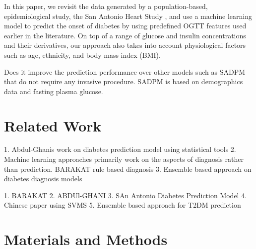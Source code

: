 \documentclass[journal,comsoc]{IEEEtran}
\begin{document}
In this paper, we revisit the data generated by a population-based, epidemiological study, the San Antonio Heart Study \cite{burke_rapid_1999, lorenzo_trend_2006}, and use a machine learning model to predict the onset of diabetes by using predefined OGTT features used earlier in the literature. On top of a range of glucose and insulin concentrations and their derivatives, our approach also takes into account physiological factors such as age, ethnicity, and body mass index (BMI).
%

Does it improve the prediction performance over other models such as SADPM that do not require any invasive procedure. SADPM is based on demographics data and fasting plasma glucose.





\section{Related Work}

1. Abdul-Ghanis work on diabetes prediction model using statistical tools
2. Machine learning approaches primarily work on the aspects of diagnosis rather than prediction.
    BARAKAT rule based diagnosis
3. Ensemble based approach on diabetes diagnosis models

1. BARAKAT
2. ABDUl-GHANI
3. SAn Antonio Diabetes Prediction Model
4. Chinese paper using SVMS
5. Ensemble based approach for T2DM prediction

\section{Materials and Methods}
%
\end{document}
